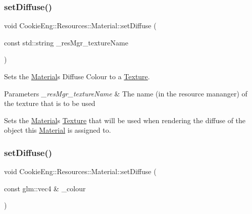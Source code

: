 \subsubsection{\texorpdfstring{set\+Diffuse()}{setDiffuse()}\hspace{0.1cm}{\footnotesize\ttfamily [1/2]}}
{\footnotesize\ttfamily void Cookie\+Eng\+::\+Resources\+::\+Material\+::set\+Diffuse (\begin{DoxyParamCaption}\item[{const std\+::string}]{\+\_\+res\+Mgr\+\_\+texture\+Name }\end{DoxyParamCaption})}



Sets the \hyperlink{class_cookie_eng_1_1_resources_1_1_material}{Material}\textquotesingle{}s Diffuse Colour to a \hyperlink{class_cookie_eng_1_1_resources_1_1_texture}{Texture}. 


\begin{DoxyParams}{Parameters}
{\em \+\_\+res\+Mgr\+\_\+texture\+Name} & The name (in the resource mananger) of the texture that is to be used\\
\hline
\end{DoxyParams}
Sets the \hyperlink{class_cookie_eng_1_1_resources_1_1_material}{Material}\textquotesingle{}s \hyperlink{class_cookie_eng_1_1_resources_1_1_texture}{Texture} that will be used when rendering the diffuse of the object this \hyperlink{class_cookie_eng_1_1_resources_1_1_material}{Material} is assigned to. \mbox{\label{class_cookie_eng_1_1_resources_1_1_material_abd2e0f6b5a0ea9987cc545859d8cc14e}} 
\subsubsection{\texorpdfstring{set\+Diffuse()}{setDiffuse()}\hspace{0.1cm}{\footnotesize\ttfamily [2/2]}}
{\footnotesize\ttfamily void Cookie\+Eng\+::\+Resources\+::\+Material\+::set\+Diffuse (\begin{DoxyParamCaption}\item[{const glm\+::vec4 \&}]{\+\_\+colour }\end{DoxyParamCaption})}




